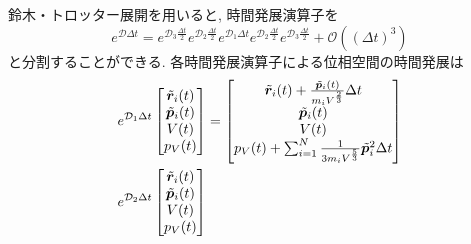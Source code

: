 鈴木・トロッター展開を用いると, 時間発展演算子を
\begin{equation}
 e^{\mathcal{D} \Delta t}
  =
  e^{\mathcal{D}_{3} \frac{\Delta t}{2}}
  e^{\mathcal{D}_{2} \frac{\Delta t}{2}}
  e^{\mathcal{D}_{1} \Delta t}
  e^{\mathcal{D}_{2} \frac{\Delta t}{2}}
  e^{\mathcal{D}_{3} \frac{\Delta t}{2}}
  + \mathcal{O}\left( (\Delta t)^{3} \right)
 \label{eq:Andersen19}
\end{equation}
と分割することができる. 
各時間発展演算子による位相空間の時間発展は
\begin{align}
 e^{\mathcal{D}_{1} \Delta t}
 \begin{bmatrix}
  \Tilde{\bm{r}}_{i} (t) \\
  \Tilde{\bm{p}}_{i} (t) \\
  V (t) \\
  p_{V} (t)
 \end{bmatrix}
 &=
 \begin{bmatrix}
  \Tilde{\bm{r}}_{i} (t)
  + \frac{\Tilde{\bm{p}}_{i}(t)}{m_{i} V^{\frac{2}{3}}} \Delta t
  \\
  \Tilde{\bm{p}}_{i} (t)
  \\
  V(t)
  \\
  p_{V}(t) + \sum_{i=1}^{N} \frac{1}{3 m_{i} V^{\frac{5}{3}}}
  \Tilde{\bm{p}}_{i}^{2} \Delta t
 \end{bmatrix}
 \label{eq:Andersen20.1}
 \\
 e^{\mathcal{D}_{2} \Delta t}
 \begin{bmatrix}
  \Tilde{\bm{r}}_{i} (t) \\
  \Tilde{\bm{p}}_{i} (t) \\
  V (t) \\
  p_{V} (t)
 \end{bmatrix}

\end{align}
